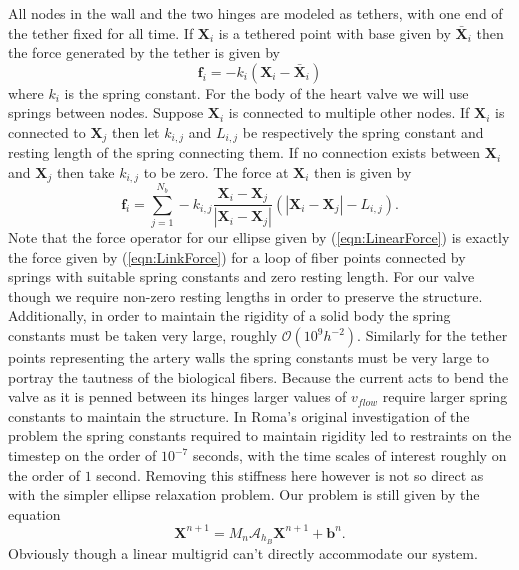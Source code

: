 \documentclass[preprint,12pt]{elsarticle}
\begin{document}
All nodes in the wall and the two hinges are modeled as tethers, with one end of the tether fixed for all time. If $\mathbf{X}_i$ is a tethered point with base given by $\bar{\mathbf{X}}_i$ then the force generated by the tether is given by 
\begin{equation}
\mathbf{f}_i = -k_i (\mathbf{X}_i-\bar{\mathbf{X}}_i)
\label{eqn:TetherForce}
\end{equation}
where $k_i$ is the spring constant. For the body of the heart valve we will use springs between nodes. Suppose $\mathbf{X}_i$ is connected to multiple other nodes. If $\mathbf{X}_i$ is connected to $\mathbf{X}_j$ then let $k_{i,j}$ and $L_{i,j}$ be respectively the spring constant and resting length of the spring connecting them. If no connection exists between $\mathbf{X}_i$ and $\mathbf{X}_j$ then take $k_{i,j}$ to be zero. The force at $\mathbf{X}_i$ then is given by
\begin{equation}
\mathbf{f}_i = \sum_{j=1}^{N_b} -k_{i,j} \frac{\mathbf{X}_i-\mathbf{X}_j}{|\mathbf{X}_i-\mathbf{X}_j|}
(|\mathbf{X}_i-\mathbf{X}_j| - L_{i,j}).
\label{eqn:LinkForce}
\end{equation}
Note that the force operator for our ellipse given by (\ref{eqn:LinearForce}) is exactly the force given by (\ref{eqn:LinkForce}) for a loop of fiber points connected by springs with suitable spring constants and zero resting length.
For our valve though we require non-zero resting lengths in order to preserve the structure. Additionally, in order to maintain the rigidity of a solid body the spring constants must be taken very large, roughly $\mathcal{O}(10^9h^{-2})$. Similarly for the tether points representing the artery walls the spring constants must be very large to portray the tautness of the biological fibers. Because the current acts to bend the valve as it is penned between its hinges larger values of $v_{flow}$ require larger spring constants to maintain the structure. In Roma's original investigation of the problem the spring constants required to maintain rigidity led to restraints on the timestep on the order of $10^{-7}$ seconds, with the time scales of interest roughly on the order of $1$ second. Removing this stiffness here however is not so direct as with the simpler ellipse relaxation problem. Our problem is still given by the equation
\begin{equation}
\mathbf{X}^{n+1} = \mathit{M}_n\mathcal{A}_{h_B} \mathbf{X}^{n+1} + \mathbf{b}^n.
\label{eqn:Sys2again}
\end{equation}
Obviously though a linear multigrid can't directly accommodate our system. 
\end{document}
